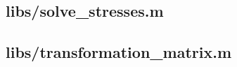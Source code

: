 \documentclass{article}
\begin{document}
\begin{appendices}
\subsection{libs/solve\_stresses.m}\label{app:libs/solve_stresses.m}


\subsection{libs/transformation\_matrix.m}\label{app:libs/transformation_matrix.m}





\end{appendices}
\end{document}
